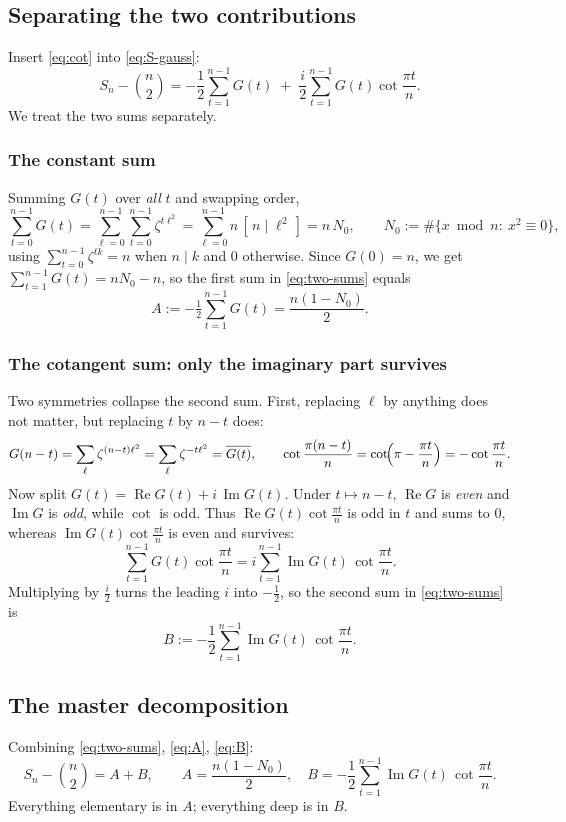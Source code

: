\documentclass[11pt]{article}
\DeclareMathOperator{\Imag}{Im}
\DeclareMathOperator{\Real}{Re}
\begin{document}
\subsection{Separating the two contributions}
Insert \eqref{eq:cot} into \eqref{eq:S-gauss}:
\begin{equation}\label{eq:two-sums}
S_n-\binom n2=-\frac12\sum_{t=1}^{n-1}G(t)\;+\;\frac{i}{2}\sum_{t=1}^{n-1}G(t)\cot\frac{\pi t}{n}.
\end{equation}
We treat the two sums separately.

\subsubsection*{The constant sum}
Summing $G(t)$ over \emph{all} $t$ and swapping order,
\[
\sum_{t=0}^{n-1}G(t)=\sum_{\ell=0}^{n-1}\sum_{t=0}^{n-1}\zeta^{t\ell^2}
=\sum_{\ell=0}^{n-1} n\,[\,n\mid \ell^2\,]=n\,N_0,\qquad N_0:=\#\{x\bmod n:\ x^2\equiv0\},
\]
using $\sum_{t=0}^{n-1}\zeta^{tk}=n$ when $n\mid k$ and $0$ otherwise. Since $G(0)=n$, we get
$\sum_{t=1}^{n-1}G(t)=nN_0-n$, so the first sum in \eqref{eq:two-sums} equals
\begin{equation}\label{eq:A}
A:=-\tfrac12\sum_{t=1}^{n-1}G(t)=\frac{n(1-N_0)}{2}.
\end{equation}

\subsubsection*{The cotangent sum: only the imaginary part survives}
Two symmetries collapse the second sum. First, replacing $\ell$ by anything does not matter, but replacing
$t$ by $n-t$ does:
\[
G(n-t)=\sum_{\ell}\zeta^{(n-t)\ell^2}=\sum_\ell\zeta^{-t\ell^2}=\overline{G(t)},\qquad
\cot\frac{\pi(n-t)}{n}=\cot\!\Bigl(\pi-\frac{\pi t}{n}\Bigr)=-\cot\frac{\pi t}{n}.
\]
Now split $G(t)=\Real G(t)+i\,\Imag G(t)$. Under $t\mapsto n-t$, $\Real G$ is \emph{even} and $\Imag G$ is
\emph{odd}, while $\cot$ is odd. Thus $\Real G(t)\cot\frac{\pi t}{n}$ is odd in $t$ and sums to $0$, whereas
$\Imag G(t)\cot\frac{\pi t}{n}$ is even and survives:
\[
\sum_{t=1}^{n-1}G(t)\cot\frac{\pi t}{n}=i\sum_{t=1}^{n-1}\Imag G(t)\,\cot\frac{\pi t}{n}.
\]
Multiplying by $\tfrac i2$ turns the leading $i$ into $-\tfrac12$, so the second sum in \eqref{eq:two-sums} is
\begin{equation}\label{eq:B}
B:=-\frac12\sum_{t=1}^{n-1}\Imag G(t)\,\cot\frac{\pi t}{n}.
\end{equation}

\subsection{The master decomposition}
Combining \eqref{eq:two-sums}, \eqref{eq:A}, \eqref{eq:B}:
\begin{equation}\label{eq:master}
\boxed{\;S_n-\binom n2=A+B,\qquad A=\frac{n(1-N_0)}{2},\quad B=-\frac12\sum_{t=1}^{n-1}\Imag G(t)\,\cot\frac{\pi t}{n}.\;}
\end{equation}
Everything elementary is in $A$; everything deep is in $B$.
\end{document}
